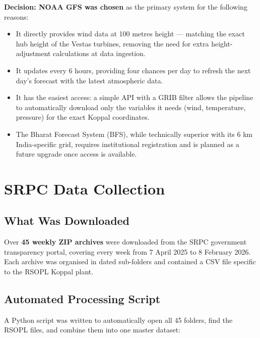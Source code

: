 \documentclass[12pt,a4paper]{report}
\begin{document}
\textbf{Decision: NOAA GFS was chosen} as the primary system for the following reasons:
\begin{itemize}
    \item It directly provides wind data at 100 metres height --- matching the exact hub height of the Vestas turbines, removing the need for extra height-adjustment calculations at data ingestion.
    \item It updates every 6 hours, providing four chances per day to refresh the next day's forecast with the latest atmospheric data.
    \item It has the easiest access: a simple API with a GRIB filter allows the pipeline to automatically download only the variables it needs (wind, temperature, pressure) for the exact Koppal coordinates.
    \item The Bharat Forecast System (BFS), while technically superior with its 6 km India-specific grid, requires institutional registration and is planned as a future upgrade once access is available.
\end{itemize}

\section{SRPC Data Collection}

\subsection{What Was Downloaded}

Over \textbf{45 weekly ZIP archives} were downloaded from the SRPC government transparency portal, covering every week from 7 April 2025 to 8 February 2026. Each archive was organised in dated sub-folders and contained a CSV file specific to the RSOPL Koppal plant.

\subsection{Automated Processing Script}

A Python script was written to automatically open all 45 folders, find the RSOPL files, and combine them into one master dataset:
\end{document}
